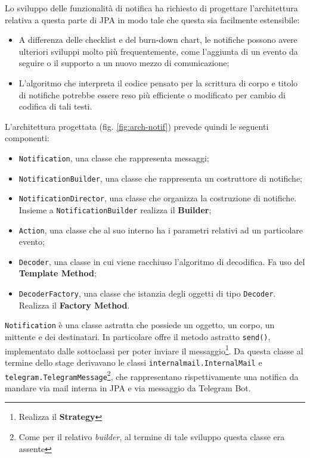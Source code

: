 Lo sviluppo delle funzionalità di notifica ha richiesto di progettare
l'architettura relativa a questa parte di JPA in modo tale che questa sia
facilmente estensibile:

\begin{itemize}
\item A differenza delle checklist e del burn-down chart, le notifiche possono
  avere ulteriori sviluppi molto più frequentemente, come l'aggiunta di un
  evento da seguire o il supporto a un nuovo mezzo di comunicazione;
\item L'algoritmo che interpreta il codice pensato per la scrittura di corpo e
  titolo di notifiche potrebbe essere reso più efficiente o modificato per
  cambio di codifica di tali testi.
\end{itemize}

L'architettura progettata (fig. \ref{fig:arch-notif}) prevede quindi le
seguenti componenti:

\begin{itemize}
\item \texttt{Notification}, una classe che rappresenta messaggi;
\item \texttt{NotificationBuilder}, una classe che rappresenta un costruttore
  di notifiche;
\item \texttt{NotificationDirector}, una classe che organizza la costruzione
  di notifiche. Insieme a \texttt{NotificationBuilder} realizza il
   \textbf{Builder};
\item \texttt{Action}, una classe che al suo interno ha i parametri relativi
  ad un particolare evento;
\item \texttt{Decoder}, una classe in cui viene racchiuso l'algoritmo di
  decodifica. Fa uso del  \textbf{Template Method};
\item \texttt{DecoderFactory}, una classe che istanzia degli oggetti di tipo
  \texttt{Decoder}. Realizza il  \textbf{Factory Method}.
\end{itemize}

\texttt{Notification} è una classe astratta che possiede un oggetto, un corpo,
un mittente e dei destinatari. In particolare offre il metodo astratto
\texttt{send()}, implementato dalle sottoclassi per poter inviare il
messaggio\footnote{Realizza il  \textbf{Strategy}}. Da
questa classe al termine dello stage derivavano le classi
\texttt{internalmail.InternalMail} e
\texttt{telegram.TelegramMessage}\footnote{Come per il relativo
\emph{builder}, al termine di tale sviluppo questa classe era assente}, che
rappresentano rispettivamente una notifica da mandare via mail interna in JPA
e via messaggio da Telegram Bot.

